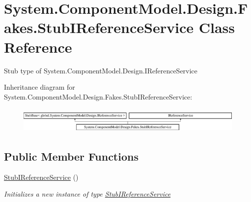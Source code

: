 \hypertarget{class_system_1_1_component_model_1_1_design_1_1_fakes_1_1_stub_i_reference_service}{\section{System.\-Component\-Model.\-Design.\-Fakes.\-Stub\-I\-Reference\-Service Class Reference}
\label{class_system_1_1_component_model_1_1_design_1_1_fakes_1_1_stub_i_reference_service}
}


Stub type of System.\-Component\-Model.\-Design.\-I\-Reference\-Service 


Inheritance diagram for System.\-Component\-Model.\-Design.\-Fakes.\-Stub\-I\-Reference\-Service\-:\begin{figure}[H]
\begin{center}
\leavevmode
\includegraphics[height=1.302326cm]{class_system_1_1_component_model_1_1_design_1_1_fakes_1_1_stub_i_reference_service}
\end{center}
\end{figure}
\subsection*{Public Member Functions}
\begin{DoxyCompactItemize}
\item 
\hyperlink{class_system_1_1_component_model_1_1_design_1_1_fakes_1_1_stub_i_reference_service_afffb8e6c64def02afe5c23ee16fe0ea5}{Stub\-I\-Reference\-Service} ()
\begin{DoxyCompactList}\small\item\em Initializes a new instance of type \hyperlink{class_system_1_1_component_model_1_1_design_1_1_fakes_1_1_stub_i_reference_service}{Stub\-I\-Reference\-Service}\end{DoxyCompactList}\end{DoxyCompactItemize}
